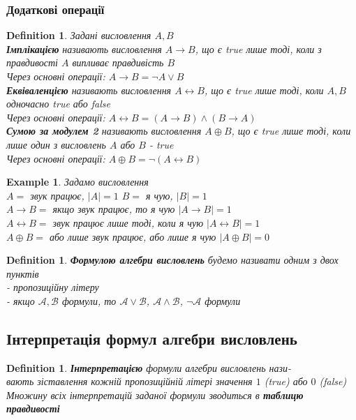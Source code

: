 \documentclass[a4paper, 14pt]{extarticle}
\theoremstyle{theoremdd}
\theoremstyle{theoremdd}
\newtheorem{definition}[theorem]{Definition}
\theoremstyle{theoremdd}
\theoremstyle{theoremdd}
\newtheorem{example}[theorem]{Example}
\theoremstyle{theoremdd}
\theoremstyle{theoremdd}
\theoremstyle{theoremdd}
\theoremstyle{theoremdd}
\begin{document}
\subsubsection*{Додаткові операції}
\begin{definition}
Задані висловлення $A,B$\\
\textbf{Імплікацією} називають висловлення $A \rightarrow B$, що є true лише тоді, коли з правдивості $A$ випливає правдивість $B$\\
Через основні операції: $A \rightarrow B = \neg A \vee B$
\bigskip \\
\textbf{Еквіваленцією} називають висловлення $A \leftrightarrow B$, що є true лише тоді, коли $A,B$ одночасно true або false\\
Через основні операції: $A \leftrightarrow B = (A \rightarrow B) \wedge (B \rightarrow A)$
\bigskip \\
\textbf{Сумою за модулем 2} називають висловлення $A \oplus B$, що є true лише тоді, коли лише один з висловлень $A$ або $B$ - true\\
Через основні операції: $A \oplus B = \neg(A \leftrightarrow B)$
\end{definition}

\begin{example} Задамо висловлення\\
$A = $ звук працює, $|A| = 1$ \hspace{0.5cm} $B = $ я чую, $|B| = 1$\\
$A \rightarrow B =$ якщо звук працює, то я чую \hspace{3.3cm} $|A \rightarrow B| = 1$\\
$A \leftrightarrow B =$ звук працює лише тоді, коли я чую \hspace{1.7cm} $|A \leftrightarrow B| = 1$\\
$A \oplus B =$ або лише звук працює, або лише я чую \hspace{1cm} $|A \oplus B| = 0$
\end{example}

\begin{definition}
\textbf{Формулою алгебри висловлень} будемо називати одним з двох пунктів\\
- пропозиційну літеру\\
- якщо $\mathcal{A}, \mathcal{B}$ формули, то $\mathcal{A} \vee \mathcal{B}$, $\mathcal{A} \wedge \mathcal{B}$, $\neg \mathcal{A}$ формули
\end{definition}

\subsection{Інтерпретація формул алгебри висловлень}
\begin{definition}
\textbf{Інтерпретацією} формули алгебри висловлень нази-\\вають зіставлення кожній пропозиційній літері значення $1$ (true) або $0$ (false)\\
Множину всіх інтерпретацій заданої формули зводиться в \textbf{таблицю правдивості}
\end{definition}
\end{document}
